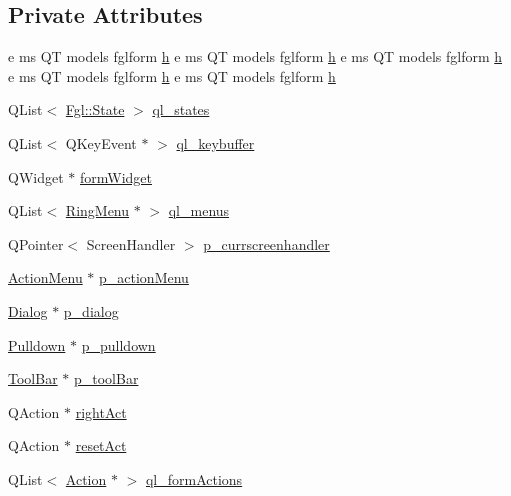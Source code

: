 \subsection*{Private Attributes}
\begin{DoxyCompactItemize}
\item 
e ms QT models fglform \hyperlink{classFglForm_a2adf651bccc4bd01a985a0c5bde45af7}{h} e ms QT models fglform \hyperlink{classFglForm_a2adf651bccc4bd01a985a0c5bde45af7}{h} e ms QT models fglform \hyperlink{classFglForm_a2adf651bccc4bd01a985a0c5bde45af7}{h} e ms QT models fglform \hyperlink{classFglForm_a2adf651bccc4bd01a985a0c5bde45af7}{h} e ms QT models fglform \hyperlink{classFglForm_a2adf651bccc4bd01a985a0c5bde45af7}{h}
\item 
QList$<$ \hyperlink{namespaceFgl_a66700792cb225549384ae76c1057cf22}{Fgl::State} $>$ \hyperlink{classFglForm_a18774054d5c9773a7075b5933b0bbc9a}{ql\_\-states}
\item 
QList$<$ QKeyEvent $\ast$ $>$ \hyperlink{classFglForm_a2164d9fc4e8c4be30d54ec2a99e881ea}{ql\_\-keybuffer}
\item 
QWidget $\ast$ \hyperlink{classFglForm_a382565fe4e148f5e37aabea41e079809}{formWidget}
\item 
QList$<$ \hyperlink{classRingMenu}{RingMenu} $\ast$ $>$ \hyperlink{classFglForm_a587196a08706e03ec05f1fae4048f344}{ql\_\-menus}
\item 
QPointer$<$ ScreenHandler $>$ \hyperlink{classFglForm_a98e11b2d55100f907821e3a8281b4ab5}{p\_\-currscreenhandler}
\item 
\hyperlink{classActionMenu}{ActionMenu} $\ast$ \hyperlink{classFglForm_aace1d4f7b637af4d3aa86e53a770152e}{p\_\-actionMenu}
\item 
\hyperlink{classDialog}{Dialog} $\ast$ \hyperlink{classFglForm_afa28d86c6e353e3e31c677b463199a4a}{p\_\-dialog}
\item 
\hyperlink{classPulldown}{Pulldown} $\ast$ \hyperlink{classFglForm_a87a0ac69973f45c48fb629d04ac5b364}{p\_\-pulldown}
\item 
\hyperlink{classToolBar}{ToolBar} $\ast$ \hyperlink{classFglForm_a63ee680575b50bd02473649cd3d272f5}{p\_\-toolBar}
\item 
QAction $\ast$ \hyperlink{classFglForm_ac85748725f2a9ba437e62be1293eae02}{rightAct}
\item 
QAction $\ast$ \hyperlink{classFglForm_aa9bb2c29fa0161164dd5250a7602a1be}{resetAct}
\item 
QList$<$ \hyperlink{classAction}{Action} $\ast$ $>$ \hyperlink{classFglForm_a091b50c03ba4a353485d34ea34f4001a}{ql\_\-formActions}

\end{DoxyCompactItemize}
